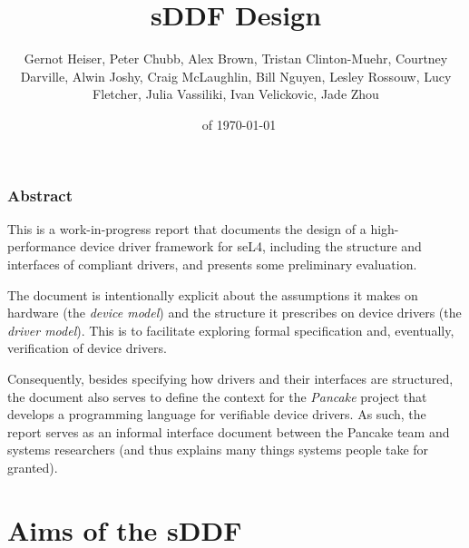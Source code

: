 \documentclass[a4paper,12pt]{report}
\renewcommand{\lstlistoflistings}{\begingroup
    \tocfile{List of Listings}{lol}
\endgroup}
\begin{document}
\newcommand{\lstnumberautorefname}{Line}
\renewcommand{\chapterautorefname}{Chapter}
\renewcommand{\sectionautorefname}{Section}
\renewcommand{\subsectionautorefname}{Section}
\renewcommand{\subsubsectionautorefname}{Section}
\renewcommand{\appendixautorefname}{Appendix}
\renewcommand{\Hfootnoteautorefname}{Footnote}

\setcounter{topnumber}{2}
\renewcommand{\topfraction}{0.91}


\title{sDDF Design}
\author{Gernot Heiser, Peter Chubb, Alex Brown, Tristan Clinton-Muehr,
        Courtney Darville, Alwin Joshy, Craig McLaughlin, Bill Nguyen, Lesley Rossouw,
        Lucy Fletcher, Julia Vassiliki, Ivan Velickovic, Jade Zhou}
\date{\Release \ifDraft\ of \today\fi}
\maketitle

\subsection*{Abstract}

This is a work-in-progress report that documents the design of a
high-performance device driver framework for seL4, including the
structure and interfaces of compliant drivers, and presents some
preliminary evaluation.

The document is intentionally explicit about the assumptions it makes on
hardware (the \emph{device model}) and the structure it prescribes on
device drivers (the \emph{driver model}). This is to
facilitate exploring formal specification and, eventually,
verification of device drivers.

Consequently, besides specifying how drivers and their interfaces are
structured, the document also serves to define the context for the
\emph{Pancake} project that develops a programming language for
verifiable device drivers. As such, the report serves as an informal
interface document between the Pancake team and systems researchers
(and thus explains many things systems people take for granted).

\tableofcontents
\listoffigures
\lstlistoflistings
\printnoidxglossaries

\chapter{Aims of the sDDF}\label{s:aims}
\end{document}
